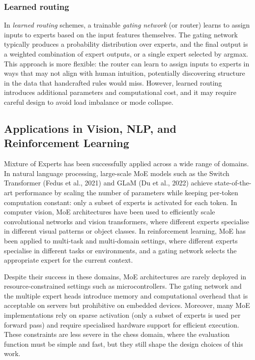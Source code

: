 \subsubsection{Learned routing}
In \emph{learned routing} schemes, a trainable \emph{gating network} (or router) learns to assign inputs to experts based on the input features themselves. The gating network typically produces a probability distribution over experts, and the final output is a weighted combination of expert outputs, or a single expert selected by argmax. This approach is more flexible: the router can learn to assign inputs to experts in ways that may not align with human intuition, potentially discovering structure in the data that handcrafted rules would miss. However, learned routing introduces additional parameters and computational cost, and it may require careful design to avoid load imbalance or mode collapse.

\subsection{Applications in Vision, NLP, and Reinforcement Learning}

Mixture of Experts has been successfully applied across a wide range of domains. In natural language processing, large-scale MoE models such as the Switch Transformer (Fedus et al., 2021) and GLaM (Du et al., 2022) achieve state-of-the-art performance by scaling the number of parameters while keeping per-token computation constant: only a subset of experts is activated for each token. In computer vision, MoE architectures have been used to efficiently scale convolutional networks and vision transformers, where different experts specialise in different visual patterns or object classes. In reinforcement learning, MoE has been applied to multi-task and multi-domain settings, where different experts specialise in different tasks or environments, and a gating network selects the appropriate expert for the current context.


Despite their success in these domains, MoE architectures are rarely deployed in resource-constrained settings such as microcontrollers. The gating network and the multiple expert heads introduce memory and computational overhead that is acceptable on servers but prohibitive on embedded devices. Moreover, many MoE implementations rely on sparse activation (only a subset of experts is used per forward pass) and require specialised hardware support for efficient execution. These constraints are less severe in the chess domain, where the evaluation function must be simple and fast, but they still shape the design choices of this work.

